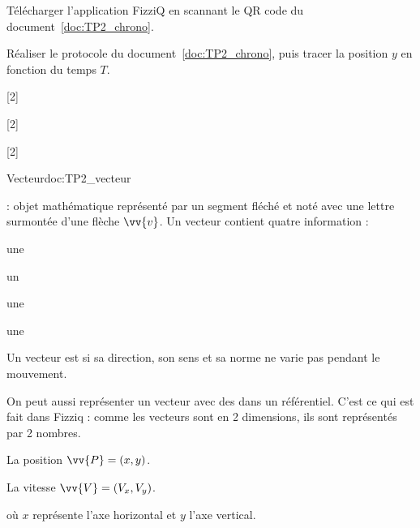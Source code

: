 \telechargement Télécharger l'application FizziQ en scannant le QR code du document~\ref{doc:TP2_chrono}.

\mesure Réaliser le protocole du document~\ref{doc:TP2_chrono}, puis tracer la position $y$ en fonction du temps $T$.

[2]

[2]


\pasCorrection{ \newpage \vspace*{-30pt} }
[2]

\begin{doc}{Vecteur}{doc:TP2_vecteur}
  \begin{importants}
     : objet mathématique représenté par un segment fléché \reaction et noté avec une lettre surmontée d'une flèche $\vv{v}$.    
    Un vecteur contient quatre information : 
    \begin{listePoints}[4]
      \item une 
      \item un 
      \item une 
      \item une 
    \end{listePoints}
    \vspace*{-4pt}
  
    Un vecteur est  si sa direction, son sens et sa norme ne varie pas pendant le mouvement.
  \end{importants}
  On peut aussi représenter un vecteur avec des  dans un référentiel.
  C'est ce qui est fait dans Fizziq : comme les vecteurs sont en 2 dimensions, ils sont représentés par 2 nombres.
  \begin{listePoints}[2]
    \item La position $\vv{P} = (x, y)$.
    \item La vitesse $\vv{V} = (V_x, V_y)$.
  \end{listePoints}
  où $x$ représente l'axe horizontal et $y$ l'axe vertical.
\end{doc}


